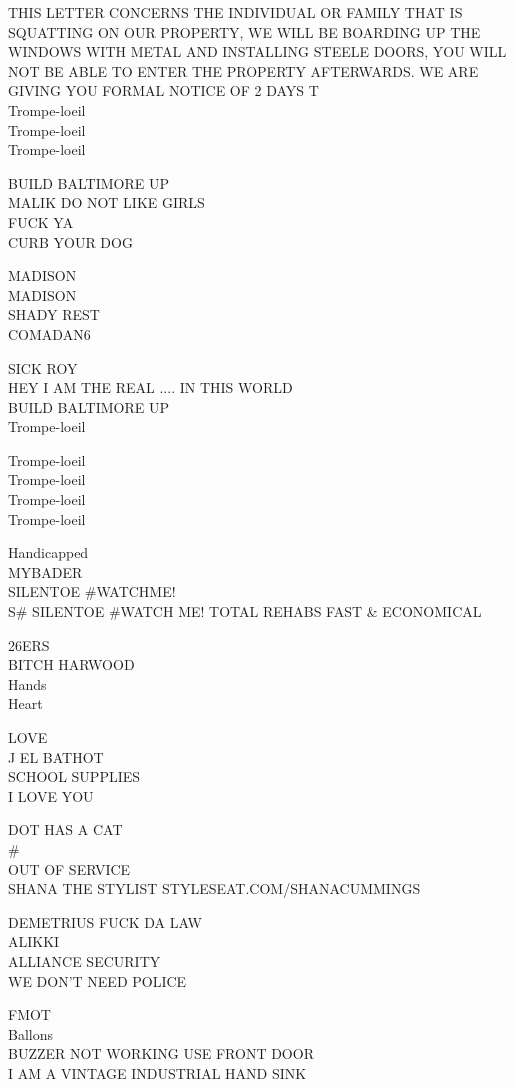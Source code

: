 \documentclass[10pt,letterpaper]{article}
\begin{document}
THIS LETTER CONCERNS THE INDIVIDUAL OR FAMILY THAT IS SQUATTING ON OUR PROPERTY, WE WILL BE BOARDING UP THE WINDOWS WITH METAL AND INSTALLING STEELE DOORS, YOU WILL NOT BE ABLE TO ENTER THE PROPERTY AFTERWARDS.  WE ARE GIVING YOU FORMAL NOTICE OF 2 DAYS T\\
Trompe{-}loeil\\
Trompe{-}loeil\\
Trompe{-}loeil

BUILD BALTIMORE UP\\
MALIK DO NOT LIKE GIRLS\\
FUCK YA\\
CURB YOUR DOG

MADISON\\
MADISON\\
SHADY REST\\
COMADAN6

SICK ROY\\
HEY I AM THE REAL .... IN THIS WORLD\\
BUILD BALTIMORE UP\\
Trompe{-}loeil

Trompe{-}loeil\\
Trompe{-}loeil\\
Trompe{-}loeil\\
Trompe{-}loeil

Handicapped\\
MYBADER\\
SILENTOE \#WATCHME!\\
S\# SILENTOE \#WATCH ME! TOTAL REHABS FAST \& ECONOMICAL

26ERS\\
BITCH HARWOOD\\
Hands\\
Heart

LOVE\\
J EL BATHOT\\
SCHOOL SUPPLIES\\
I LOVE YOU

DOT HAS A CAT\\
\#\\
OUT OF SERVICE\\
SHANA THE STYLIST STYLESEAT.COM/SHANACUMMINGS

DEMETRIUS FUCK DA LAW\\
ALIKKI\\
ALLIANCE SECURITY\\
WE DON'T NEED POLICE

FMOT\\
Ballons\\
BUZZER NOT WORKING USE FRONT DOOR\\
I AM A VINTAGE INDUSTRIAL HAND SINK
\end{document}
